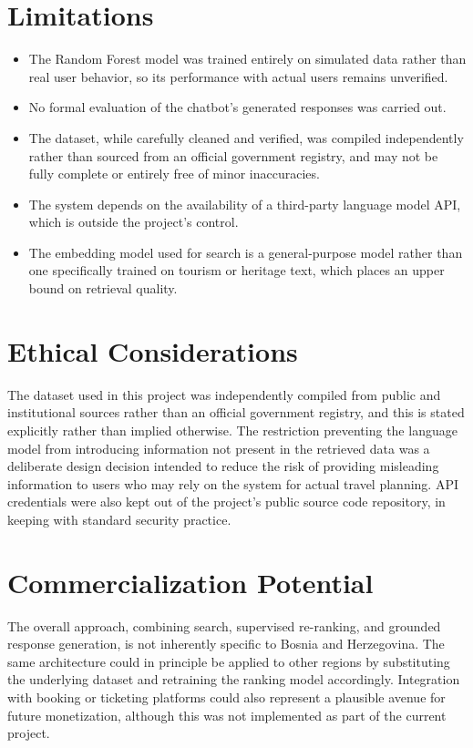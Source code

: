 \documentclass[conference]{IEEEtran}
\begin{document}
\section{Limitations}
\begin{itemize}
\item The Random Forest model was trained entirely on simulated data rather than real user behavior, so its performance with actual users remains unverified.
\item No formal evaluation of the chatbot's generated responses was carried out.
\item The dataset, while carefully cleaned and verified, was compiled independently rather than sourced from an official government registry, and may not be fully complete or entirely free of minor inaccuracies.
\item The system depends on the availability of a third-party language model API, which is outside the project's control.
\item The embedding model used for search is a general-purpose model rather than one specifically trained on tourism or heritage text, which places an upper bound on retrieval quality.
\end{itemize}

\section{Ethical Considerations}
The dataset used in this project was independently compiled from public and institutional sources rather than an official government registry, and this is stated explicitly rather than implied otherwise. The restriction preventing the language model from introducing information not present in the retrieved data was a deliberate design decision intended to reduce the risk of providing misleading information to users who may rely on the system for actual travel planning. API credentials were also kept out of the project's public source code repository, in keeping with standard security practice.

\section{Commercialization Potential}
The overall approach, combining search, supervised re-ranking, and grounded response generation, is not inherently specific to Bosnia and Herzegovina. The same architecture could in principle be applied to other regions by substituting the underlying dataset and retraining the ranking model accordingly. Integration with booking or ticketing platforms could also represent a plausible avenue for future monetization, although this was not implemented as part of the current project.
\end{document}
